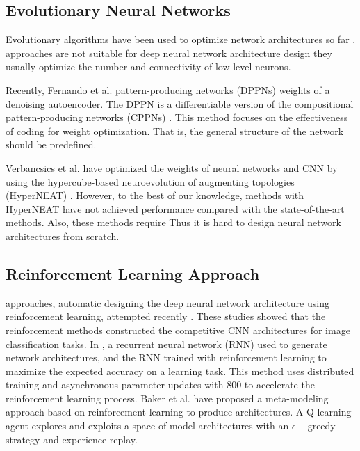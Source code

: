 \subsection{Evolutionary Neural Networks}
Evolutionary algorithms have been used to optimize  network architectures so far \cite{schaffer_combinations_1992,stanley_evolving_2002}.  approaches are not suitable for  deep neural network architecture design  they usually optimize the number and connectivity of low-level neurons.

Recently, Fernando et al. \cite{fernando_convolution_2016}   pattern-producing networks (DPPNs)  weights of a denoising autoencoder. The DPPN is a differentiable version of the compositional pattern-producing networks (CPPNs) \cite{stanley_compositional_2007}. This method focuses on the effectiveness of  coding for weight optimization. That is, the general structure of the network should be predefined.

Verbancsics et al. \cite{verbancsics_generative_2013,verbancsics_image_2015} have optimized the weights of  neural networks and CNN by using the hypercube-based neuroevolution of augmenting topologies (HyperNEAT) \cite{stanley_hypercube-based_2009}. However, to the best of our knowledge,  methods with HyperNEAT have not achieved  performance compared with the state-of-the-art methods. Also, these methods require  Thus\new{,} it is hard to design neural network architectures from scratch.

\subsection{Reinforcement Learning Approach}
 approaches,  automatic designing  the deep neural network architecture using reinforcement learning,  attempted recently \cite{zoph_neural_2016,baker_designing_2016}.
These studies showed that the reinforcement  methods constructed the competitive CNN architectures for image classification tasks.
In \cite{zoph_neural_2016}, a recurrent neural network (RNN)  used to generate  network architectures, and the RNN  trained with reinforcement learning to maximize the expected accuracy on a learning task.
This method uses distributed training and asynchronous parameter updates with $800$  to accelerate the reinforcement learning process.
Baker et al. \cite{baker_designing_2016} have proposed a meta-modeling approach based on reinforcement learning to produce   architectures.
A Q-learning agent explores and exploits a space of model architectures with an $\epsilon -$greedy strategy and experience replay.

